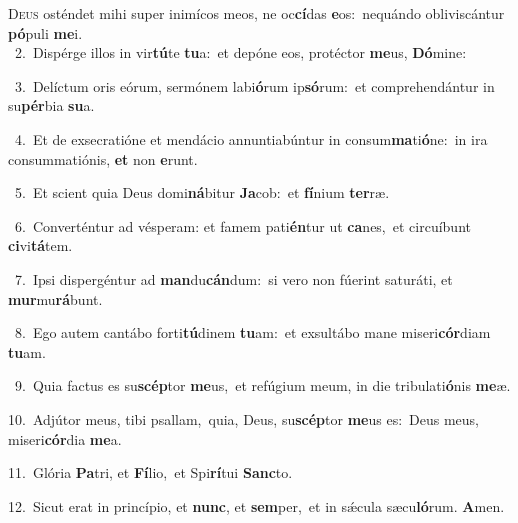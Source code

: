 \lettrine{\initial\textcolor{\initialcolor}{D}}{eus} osténdet mihi super inimícos meos, ne oc\-\textbf{cí}\-das \textbf{e}\-os:~\star nequándo obliviscántur \textbf{pó}\-puli \textbf{me}\-i.\\
{\numbfont\textcolor{\numbcolor}{~2.}}~Dispérge illos in vir\-\textbf{tú}\-te \textbf{tu}\-a:~\star et depóne eos, protéctor \textbf{me}\-us, \textbf{Dó}\-mine:\par
{\numbfont\textcolor{\numbcolor}{~3.}}~Delíctum oris eórum, sermónem labi\-\textbf{ó}\-rum ip\-\textbf{só}\-rum:~\star et comprehendántur in su\-\textbf{pér}\-bia \textbf{su}\-a.\par
{\numbfont\textcolor{\numbcolor}{~4.}}~Et de exsecratióne et mendácio annuntiabúntur in consum\-\textbf{ma}\-ti\-\textbf{ó}\-ne:~\star in ira consummatiónis, \textbf{et} non \textbf{e}\-runt.\par
{\numbfont\textcolor{\numbcolor}{~5.}}~Et scient quia Deus domi\-\textbf{ná}\-bitur \textbf{Ja}\-cob:~\star et \textbf{fí}\-nium \textbf{ter}\-ræ.\par
{\numbfont\textcolor{\numbcolor}{~6.}}~Converténtur ad vésperam: et famem pati\-\textbf{én}\-tur ut \textbf{ca}\-nes,~\star et circuíbunt \textbf{ci}\-vi\-\textbf{tá}\-tem.\par
{\numbfont\textcolor{\numbcolor}{~7.}}~Ipsi dispergéntur ad \textbf{man}\-du\-\textbf{cán}\-dum:~\star si vero non fúerint saturáti, et \textbf{mur}\-mu\-\textbf{rá}\-bunt.\par
{\numbfont\textcolor{\numbcolor}{~8.}}~Ego autem cantábo forti\-\textbf{tú}\-dinem \textbf{tu}\-am:~\star et exsultábo mane miseri\-\textbf{cór}\-diam \textbf{tu}\-am.\par
{\numbfont\textcolor{\numbcolor}{~9.}}~Quia factus es su\-\textbf{scép}\-tor \textbf{me}\-us,~\star et refúgium meum, in die tribulati\-\textbf{ó}\-nis \textbf{me}\-æ.\par
{\numbfont\textcolor{\numbcolor}{10.}}~Adjútor meus, tibi psallam,~\dagger quia, Deus, su\-\textbf{scép}\-tor \textbf{me}\-us es:~\star Deus meus, miseri\-\textbf{cór}\-dia \textbf{me}\-a.\par
{\numbfont\textcolor{\numbcolor}{11.}}~Glória \textbf{Pa}\-tri, et \textbf{Fí}\-lio,~\star et Spi\-\textbf{rí}\-tui \textbf{Sanc}\-to.\par
{\numbfont\textcolor{\numbcolor}{12.}}~Sicut erat in princípio, et \textbf{nunc}\-, et \textbf{sem}\-per,~\star et in sǽcula sæcu\-\textbf{ló}\-rum. \textbf{A}\-men.\par
